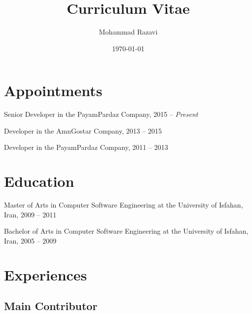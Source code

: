 \documentclass[10pt]{scrartcl}
\author{Mohammad Razavi}
\date{\today}
\title{Curriculum Vitae}
\begin{document}
\maketitle


\section*{Appointments}
\label{sec:org6a205ec}

Senior Developer in the PayamPardaz Company, 2015 -- \emph{Present}

Developer in the AmnGostar Company, 2013 -- 2015

Developer in the PayamPardaz Company, 2011 -- 2013

\section*{Education}
\label{sec:org36ad65a}

Master of Arts in Computer Software Engineering at the University of Isfahan, Iran, 2009 -- 2011

Bachelor of Arts in Computer Software Engineering at the University of Isfahan, Iran, 2005 -- 2009

\section*{Experiences}
\label{sec:org691149d}
\subsection*{Main Contributor}
\label{sec:org5a6f528}
\end{document}
